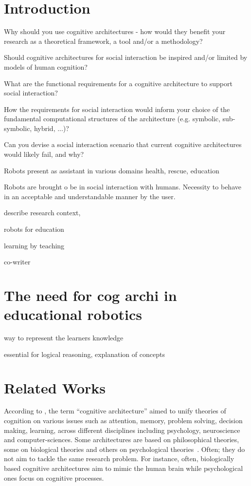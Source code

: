 \documentclass[conference]{IEEEtran}
\begin{document}
\section{Introduction}
Why should you use cognitive architectures - how would they benefit your research as a theoretical framework, a tool and/or a methodology?

Should cognitive architectures for social interaction be inspired and/or limited by models of human cognition?

What are the functional requirements for a cognitive architecture to support social interaction?

How the requirements for social interaction would inform your choice of the fundamental computational structures of the architecture (e.g. symbolic, sub-symbolic, hybrid, ...)?


Can you devise a social interaction scenario that current cognitive architectures would likely fail, and why?


Robots present as assistant in various domains health, rescue, education

Robots are brought o be in social interaction with humans.
Necessity to behave in an acceptable and understandable manner by the user.

describe research context, 


robots for education

learning by teaching

co-writer

\section{The need for cog archi in educational robotics}
way to represent the learners knowledge

essential for logical reasoning, 
explanation of concepts



\section{Related Works}
According to \cite{Vernon2011}, the term ``cognitive architecture'' aimed to unify theories of cognition on various issues such as attention, memory, problem solving, decision making, learning, across different disciplines including psychology, neuroscience and computer-sciences.
Some architectures are based on philosophical theories, some on biological theories and others on psychological theories~\cite{Thorisson2012,Chong2009}.
Often; they do not aim to tackle the same research problem. 
For instance, often, biologically based cognitive architectures aim to mimic the human brain while psychological ones focus on cognitive processes.
\end{document}
